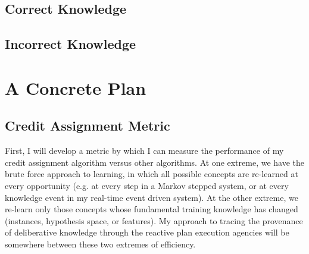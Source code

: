 \documentclass[twoside,letterpaper,11pt]{article}
\begin{document}
\subsection{Correct Knowledge}

\subsection{Incorrect Knowledge}



\section{A Concrete Plan}


%
%
%
%
%
%
%
%
%
%
%
%

\subsection{Credit Assignment Metric}

  First, I will develop a metric by which I can measure the
  performance of my credit assignment algorithm versus other
  algorithms.  At one extreme, we have the brute force approach to
  learning, in which all possible concepts are re-learned at every
  opportunity (e.g. at every step in a Markov stepped system, or at
  every knowledge event in my real-time event driven system).  At the
  other extreme, we re-learn only those concepts whose fundamental
  training knowledge has changed (instances, hypothesis space, or
  features).  My approach to tracing the provenance of deliberative
  knowledge through the reactive plan execution agencies will be
  somewhere between these two extremes of efficiency.
\end{document}
